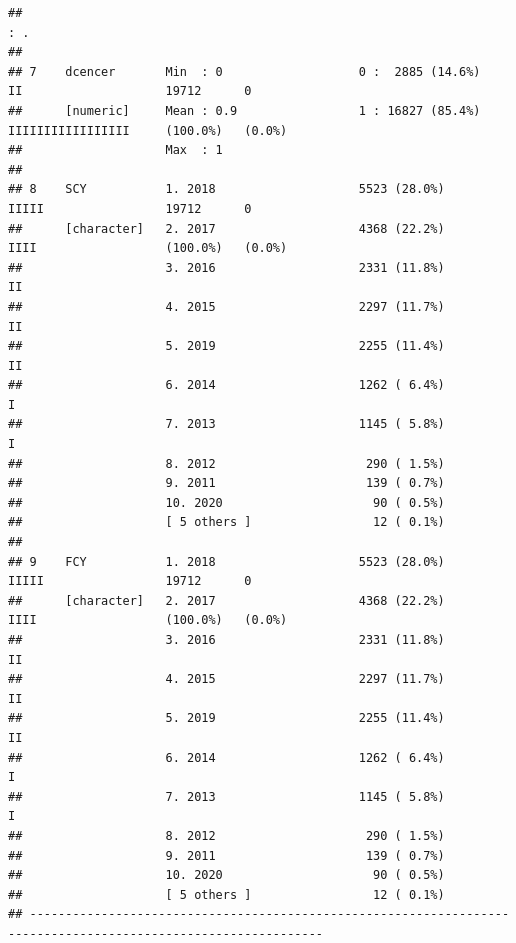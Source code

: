 \documentclass[nofonts,]{tufte-book}
\begin{document}
\begin{verbatim}
##                                                                                  : .                           
## 
## 7    dcencer       Min  : 0                   0 :  2885 (14.6%)      II                    19712      0        
##      [numeric]     Mean : 0.9                 1 : 16827 (85.4%)      IIIIIIIIIIIIIIIII     (100.0%)   (0.0%)   
##                    Max  : 1                                                                                    
## 
## 8    SCY           1. 2018                    5523 (28.0%)           IIIII                 19712      0        
##      [character]   2. 2017                    4368 (22.2%)           IIII                  (100.0%)   (0.0%)   
##                    3. 2016                    2331 (11.8%)           II                                        
##                    4. 2015                    2297 (11.7%)           II                                        
##                    5. 2019                    2255 (11.4%)           II                                        
##                    6. 2014                    1262 ( 6.4%)           I                                         
##                    7. 2013                    1145 ( 5.8%)           I                                         
##                    8. 2012                     290 ( 1.5%)                                                     
##                    9. 2011                     139 ( 0.7%)                                                     
##                    10. 2020                     90 ( 0.5%)                                                     
##                    [ 5 others ]                 12 ( 0.1%)                                                     
## 
## 9    FCY           1. 2018                    5523 (28.0%)           IIIII                 19712      0        
##      [character]   2. 2017                    4368 (22.2%)           IIII                  (100.0%)   (0.0%)   
##                    3. 2016                    2331 (11.8%)           II                                        
##                    4. 2015                    2297 (11.7%)           II                                        
##                    5. 2019                    2255 (11.4%)           II                                        
##                    6. 2014                    1262 ( 6.4%)           I                                         
##                    7. 2013                    1145 ( 5.8%)           I                                         
##                    8. 2012                     290 ( 1.5%)                                                     
##                    9. 2011                     139 ( 0.7%)                                                     
##                    10. 2020                     90 ( 0.5%)                                                     
##                    [ 5 others ]                 12 ( 0.1%)                                                     
## ---------------------------------------------------------------------------------------------------------------
\end{verbatim}
\end{document}
